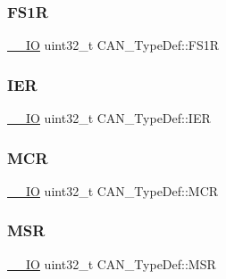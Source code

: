 \mbox{\label{struct_c_a_n___type_def_ac6296402924b37966c67ccf14a381976}} 
\subsubsection{\texorpdfstring{FS1R}{FS1R}}
{\footnotesize\ttfamily \mbox{\hyperlink{group___c_m_s_i_s___c_m3__core__definitions_gaec43007d9998a0a0e01faede4133d6be}{\+\_\+\+\_\+\+IO}} uint32\+\_\+t C\+A\+N\+\_\+\+Type\+Def\+::\+F\+S1R}

\mbox{\label{struct_c_a_n___type_def_a530babbc4b9584c93a1bf87d6ce8b8dc}} 
\subsubsection{\texorpdfstring{IER}{IER}}
{\footnotesize\ttfamily \mbox{\hyperlink{group___c_m_s_i_s___c_m3__core__definitions_gaec43007d9998a0a0e01faede4133d6be}{\+\_\+\+\_\+\+IO}} uint32\+\_\+t C\+A\+N\+\_\+\+Type\+Def\+::\+I\+ER}

\mbox{\label{struct_c_a_n___type_def_a1282eee79a22003257a7a5daa7f4a35f}} 
\subsubsection{\texorpdfstring{MCR}{MCR}}
{\footnotesize\ttfamily \mbox{\hyperlink{group___c_m_s_i_s___c_m3__core__definitions_gaec43007d9998a0a0e01faede4133d6be}{\+\_\+\+\_\+\+IO}} uint32\+\_\+t C\+A\+N\+\_\+\+Type\+Def\+::\+M\+CR}

\mbox{\label{struct_c_a_n___type_def_af98b957a4e887751fbd407d3e2cf93b5}} 
\subsubsection{\texorpdfstring{MSR}{MSR}}
{\footnotesize\ttfamily \mbox{\hyperlink{group___c_m_s_i_s___c_m3__core__definitions_gaec43007d9998a0a0e01faede4133d6be}{\+\_\+\+\_\+\+IO}} uint32\+\_\+t C\+A\+N\+\_\+\+Type\+Def\+::\+M\+SR}

